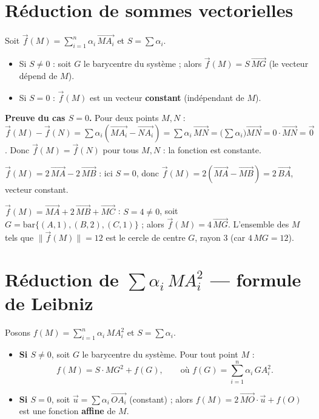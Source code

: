 \section{Réduction de sommes vectorielles}

\begin{theoreme}
Soit $\vec f(M)=\displaystyle\sum_{i=1}^{n}\alpha_i\,\overrightarrow{MA_i}$ et $S=\sum\alpha_i$.
\begin{itemize}
\item Si $S\neq0$ : soit $G$ le barycentre du système ; alors $\vec f(M)=S\,\overrightarrow{MG}$ (le vecteur dépend de $M$).
\item Si $S=0$ : $\vec f(M)$ est un vecteur \textbf{constant} (indépendant de $M$).
\end{itemize}
\end{theoreme}

\begin{remarque}
\textbf{Preuve du cas $S=0$.} Pour deux points $M,N$ :
$\vec f(M)-\vec f(N)=\sum\alpha_i(\overrightarrow{MA_i}-\overrightarrow{NA_i})
=\sum\alpha_i\,\overrightarrow{MN}=\Big(\sum\alpha_i\Big)\overrightarrow{MN}=0\cdot\overrightarrow{MN}=\vec0$.
Donc $\vec f(M)=\vec f(N)$ pour tous $M,N$ : la fonction est constante.
\end{remarque}

\begin{exemple}
$\vec f(M)=2\,\overrightarrow{MA}-2\,\overrightarrow{MB}$ : ici $S=0$, donc $\vec f(M)=2(\overrightarrow{MA}-\overrightarrow{MB})=2\,\overrightarrow{BA}$, vecteur constant.
\end{exemple}

\begin{exemple}
$\vec f(M)=\overrightarrow{MA}+2\,\overrightarrow{MB}+\overrightarrow{MC}$ : $S=4\neq0$, soit
$G=\mathrm{bar}\{(A,1),(B,2),(C,1)\}$ ; alors $\vec f(M)=4\,\overrightarrow{MG}$. L'ensemble
des $M$ tels que $\|\vec f(M)\|=12$ est le cercle de centre $G$, rayon $3$ (car $4\,MG=12$).
\end{exemple}

\section{Réduction de $\sum\alpha_i\,MA_i^{2}$ — formule de Leibniz}

\begin{theoreme}
Posons $f(M)=\displaystyle\sum_{i=1}^{n}\alpha_i\,MA_i^{2}$ et $S=\sum\alpha_i$.
\begin{itemize}
\item \textbf{Si $S\neq0$}, soit $G$ le barycentre du système. Pour tout point $M$ :
\[
f(M)=S\cdot MG^{2}+f(G),\qquad\text{où } f(G)=\sum_{i=1}^{n}\alpha_i\,GA_i^{2}.
\]
\item \textbf{Si $S=0$}, soit $\vec u=\sum\alpha_i\,\overrightarrow{OA_i}$ (constant) ; alors $f(M)=2\,\overrightarrow{MO}\cdot\vec u+f(O)$ est une fonction \textbf{affine} de $M$.
\end{itemize}
\end{theoreme}

